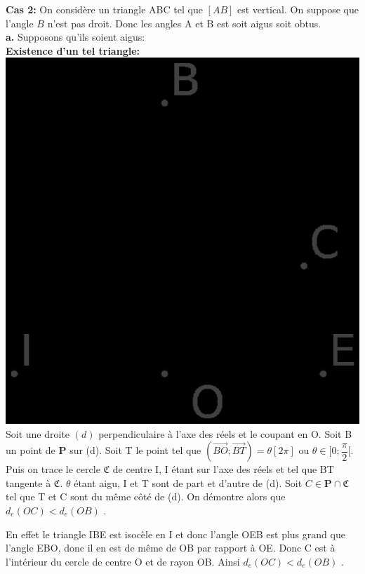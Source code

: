 \documentclass[a4paper, 12pt, twoside]{book}
\begin{document}
  \textbf{Cas 2:} On considère un triangle ABC tel que $[AB]$ est vertical. On suppose que l'angle $B$ n'est pas droit. Donc les angles A et B est soit  aigus soit obtus.  \\
  
  \textbf{a.} Supposons qu'ils soient aigus:\\
  
 
 \textbf{Existence d'un tel triangle:} \\
 
 
 \includegraphics[scale=0.5]{figures/hyper11.eps} \\
 
 Soit une droite $(d)$ perpendiculaire à l'axe des réels et le coupant en O. Soit B un point de \textbf{P} sur (d). Soit T le point tel que $(\vec{BO}; \vec{BT})=\theta [2\pi]$ ou $\theta\in [0; \dfrac{\pi}{2}[$. Puis on trace le cercle $\mathfrak{C}$ de centre I, I étant sur l'axe des réels et tel que BT tangente à $\mathfrak{C}$. $\theta$ étant aigu, I et T sont de part et d'autre de (d). Soit $C\in \boldsymbol{P}\cap \mathfrak{C}$ tel que T et C sont du même côté de (d). On démontre alors  que $d_{e}(OC)<d_{e}(OB)$ .\
 
 En effet le triangle IBE est isocèle en I et donc l'angle OEB est plus grand que l'angle EBO, donc il en est de même de OB par rapport à OE. Donc C est à l'intérieur du cercle de centre O et de rayon OB. Ainsi $d_{e}(OC)<d_{e}(OB)$ .\\
 
\end{document}
